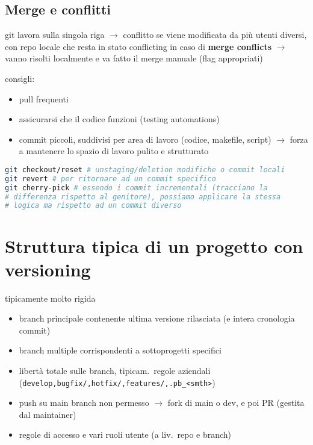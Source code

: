 \subsection{Merge e conflitti}

git lavora sulla singola riga $\rightarrow$ conflitto se viene modificata da pi\`u utenti diversi, con repo locale che resta in stato conflicting in caso di \textbf{merge conflicts} $\rightarrow$ vanno risolti localmente e va fatto il merge manuale (flag appropriati)

consigli:
\begin{itemize}
  \item pull frequenti
  \item assicurarsi che il codice funzioni (testing automations)
  \item commit piccoli, suddivisi per area di lavoro (codice, makefile, script) $\rightarrow$ forza a mantenere lo spazio di lavoro pulito e strutturato
\end{itemize}

\begin{lstlisting}[language=bash]
git checkout/reset # unstaging/deletion modifiche o commit locali
git revert # per ritornare ad un commit specifico
git cherry-pick # essendo i commit incrementali (tracciano la
# differenza rispetto al genitore), possiamo applicare la stessa
# logica ma rispetto ad un commit diverso\end{lstlisting}

\section{Struttura tipica di un progetto con versioning}

tipicamente molto rigida
\begin{itemize}
  \item branch principale contenente ultima versione rilasciata (e intera cronologia commit)
  \item branch multiple corrispondenti a sottoprogetti specifici
  \item libert\`a totale sulle branch, tipicam.~regole aziendali (\lstinline|develop,bugfix/,hotfix/,features/,.pb_<smth>|)
  \item push su main branch non permesso $\rightarrow$ fork di main o dev, e poi PR (gestita dal maintainer)
  \item regole di accesso e vari ruoli utente (a liv.~repo e branch)
\end{itemize}

